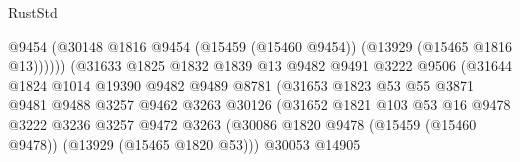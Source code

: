 \begin{lexlean}{RustStd}
\begin{coremodule}
                                            @9454
                                            (@30148
                                              @1816
                                              @9454
                                              (@15459 (@15460 @9454))
                                              (@13929 (@15465 @1816 @13))))))
                                      (@31633
                                        @1825
                                        @1832
                                        @1839
                                        @13
                                        @9482
                                        @9491
                                        @3222
                                        @9506
                                        (@31644
                                          @1824
                                          @1014
                                          @19390
                                          @9482
                                          @9489
                                          @8781
                                          (@31653
                                            @1823
                                            @53
                                            @55
                                            @3871
                                            @9481
                                            @9488
                                            @3257
                                            @9462
                                            @3263
                                            @30126
                                            (@31652
                                              @1821
                                              @103
                                              @53
                                              @16
                                              @9478
                                              @3222
                                              @3236
                                              @3257
                                              @9472
                                              @3263
                                              (@30086
                                                @1820
                                                @9478
                                                (@15459 (@15460 @9478))
                                                (@13929 (@15465 @1820 @53)))
                                              @30053
                                              @14905

\end{coremodule}
\end{lexlean}
